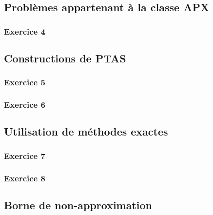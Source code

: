 \documentclass[a4paper, 12pt]{article}
\begin{document}
\subsection{Problèmes appartenant à la classe APX}

\subsubsection*{Exercice 4}


\subsection{Constructions de PTAS}

\subsubsection*{Exercice 5}


\subsubsection*{Exercice 6}


\subsection{Utilisation de méthodes exactes}

\subsubsection*{Exercice 7}


\subsubsection*{Exercice 8}



%

\subsection{Borne de non-approximation}
\end{document}
